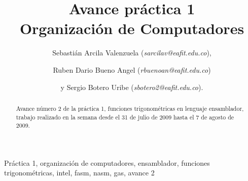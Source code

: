 \documentclass[%
	final,
	notitlepage,
	narroweqnarray,
	inline,
	twoside,
	]{ieee}
\begin{document}
\title[Avance práctica 1]{%
       Avance práctica 1 \\  Organización de Computadores}

\author[]{Sebastián Arcila Valenzuela (\textit{sarcilav@eafit.edu.co}),
\and{} Ruben Dario Bueno Angel (\textit{rbuenoan@eafit.edu.co})
\and{}y Sergio Botero Uribe (\textit{sbotero2@eafit.edu.co}).
}


\titletext{, \today}


\maketitle               

\begin{abstract} 
Avance número 2 de la práctica 1, funciones trigonométricas en lenguaje ensamblador, trabajo realizado en la semana desde el 31 de julio de 2009 hasta el 7 de agosto de 2009.
\end{abstract}

\begin{keywords}
Práctica 1, organización de computadores, ensamblador, funciones trigonométricas, intel, fasm, nasm, gas, avance 2
\end{keywords}
\end{document}
